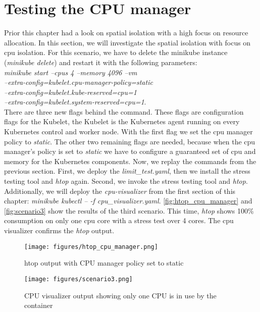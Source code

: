 \documentclass[titlepage]{report}
\begin{document}
\section{Testing the CPU manager}
Prior this chapter had a look on spatial isolation with a high focus on resource allocation. In this section, we will investigate the spatial isolation with focus on \gls{cpu} isolation.
For this scenario, we have to delete the minikube instance (\emph{minikube delete}) and restart it with the following parameters: \\\emph{minikube start --cpus 4 --memory 4096 --vm} \\\emph{--extra-config=kubelet.cpu-manager-policy=static} 
\\\emph{--extra-config=kubelet.kube-reserved=cpu=1} \\\emph{--extra-config=kubelet.system-reserved=cpu=1}.\\
There are three new flags behind the command. These flags are configuration flags for the Kubelet, the Kubelet is the Kubernetes agent running on every Kubernetes control and worker node. With the first flag
we set the \gls{cpu} manager policy to \emph{static}. The other two remaining flags are needed, because when the \gls{cpu} manager's policy is set to \emph{static} we have to configure a guaranteed
set of \gls{cpu} and memory for the Kubernetes components. Now, we replay the commands from the previous section. First, we deploy the \emph{limit\_test.yaml}, then we install the stress testing tool and \emph{htop} again.
Second, we invoke the stress testing tool and \emph{htop}. Additionally, we will deploy the \emph{cpu-visualizer} from the first section of this chapter: \emph{minikube kubectl -- -f cpu\_visualizer.yaml}.
\autoref{fig:htop_cpu_manager} and \autoref{fig:scenario3} show the results of the third scenario. This time, \emph{htop} shows 100\% consumption on only one \gls{cpu} core with a stress test over 4 cores.
The \gls{cpu} visualizer confirms the \emph{htop} output.

\begin{figure}[H]
  \centering
  \texttt{[image: figures/htop\_cpu\_manager.png]}
  \caption{htop output with CPU manager policy set to static}\label{fig:htop_cpu_manager}
\end{figure}
\begin{figure}[H]
  \centering
  \texttt{[image: figures/scenario3.png]}
  \caption{CPU visualizer output showing only one CPU is in use by the container}\label{fig:scenario3}
\end{figure}
\end{document}
